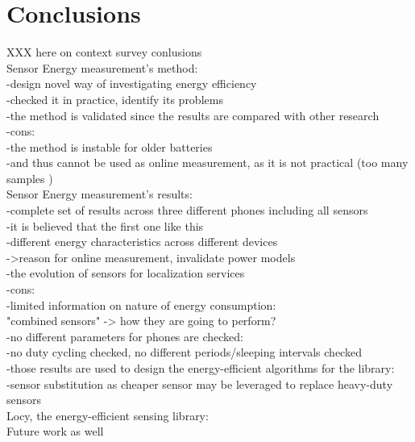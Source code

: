 \section{Conclusions}
\label{s:conc}
XXX here on context survey conlusions \\

Sensor Energy measurement's method:\\
	-design novel way of investigating energy efficiency\\
	-checked it in practice, identify its problems\\
	-the method is validated since the results are compared with other research\\
	-cons:\\
		-the method is instable for older batteries \\
			-and thus cannot be used as online measurement, as it is not practical (too many samples )\\
	
	
Sensor Energy measurement's results:\\
	-complete set of results across three different phones including all sensors\\
		-it is believed that the first one like this\\
	-different energy characteristics across different devices\\
		->reason for online measurement, invalidate power models\\
	-the evolution of sensors for localization services\\
	-cons:\\
		-limited information on nature of energy consumption:\\
			"combined sensors" -> how they are going to perform?\\
			-no different parameters for phones are checked:\\
				-no duty cycling checked, no different periods/sleeping intervals checked\\
	-those results are used to design the energy-efficient algorithms for the library:\\
		-sensor substitution as cheaper sensor may be leveraged to replace heavy-duty sensors\\
	
Locy, the energy-efficient sensing library:\\






Future work as well\\
